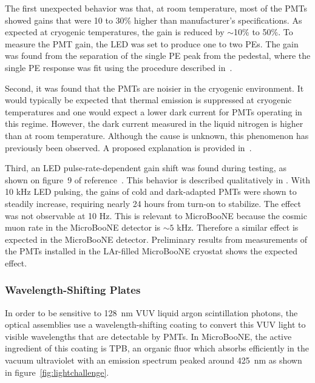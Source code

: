 The first unexpected behavior was that, at room temperature, 
most of the PMTs showed gains that were 10 to 30\% higher than manufacturer's specifications.
As expected at cryogenic temperatures, the gain is reduced by $\sim$10\% to 50\%.
To measure the PMT gain, the LED was set to produce one to two PEs.  
The gain was found from the separation of the single PE peak from the pedestal, where the single PE response was fit using the procedure described in~\cite{Bellamy:1994bv}.   

Second, it was found that the PMTs are noisier in the cryogenic environment. 
It would typically be expected that thermal emission is suppressed at cryogenic temperatures and one would expect a lower dark current 
for PMTs operating in this regime.  
However, the dark current measured in the liquid nitrogen is higher than at room temperature. 
Although the cause is unknown, this phenomenon has previously been observed\cite{Meyer:2008qb}. A proposed explanation is provided in~\cite{MeyerDark}.

Third, an LED pulse-rate-dependent gain shift was found during testing, as shown on figure~9 of reference~\cite{Briese:2013wua}.  This behavior is described qualitatively in \cite{HamamatsuBook}.  With 10 kHz LED pulsing, the gains of cold and dark-adapted PMTs were shown to steadily increase, requiring nearly 24 hours from turn-on to stabilize. The effect was not observable at 10 Hz.   This is relevant to MicroBooNE because the
cosmic muon rate in the MicroBooNE detector is $\sim 5$ kHz.  Therefore a similar effect is expected in the MicroBooNE detector.  Preliminary results from measurements of the PMTs installed in the LAr-filled MicroBooNE cryostat shows the expected effect. 



\subsubsection{Wavelength-Shifting Plates}
\label{sec:wavelengthshift}


In order to be sensitive to 128~nm VUV liquid argon scintillation photons, the optical assemblies use a wavelength-shifting coating to convert this VUV light to visible wavelengths that are detectable by PMTs.  In MicroBooNE, the active ingredient of this coating is TPB, an organic fluor which absorbs efficiently in the vacuum ultraviolet with an emission spectrum peaked around 425~nm \cite{Burton:1973} as shown in figure~\ref{fig:lightchallenge}. 

